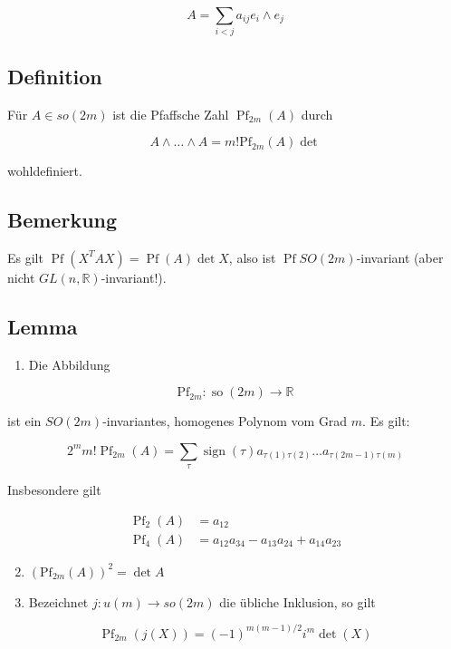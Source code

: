 \documentclass[10pt, letterpaper]{article}
\begin{document}
$$
A=\sum_{i<j} a_{i j} e_{i} \wedge e_{j}
$$

\subsection*{Definition}
Für $A \in s o(2 m)$ ist die Pfaffsche Zahl $\operatorname{Pf}_{2 m}(A)$ durch

$$
A \wedge \ldots \wedge A=m!\mathrm{Pf}_{2 m}(A) \operatorname{det}
$$

wohldefiniert.

\subsection*{Bemerkung}
Es gilt $\operatorname{Pf}\left(X^{T} A X\right)=\operatorname{Pf}(A) \operatorname{det} X$, also ist $\operatorname{Pf} S O(2 m)$-invariant (aber nicht $G L(n, \mathbb{R})$-invariant!).

\subsection*{Lemma}
\begin{enumerate}
  \item Die Abbildung
\end{enumerate}

$$
\mathrm{Pf}_{2 m}: \operatorname{so}(2 m) \rightarrow \mathbb{R}
$$

ist ein $S O(2 m)$-invariantes, homogenes Polynom vom Grad $m$. Es gilt:

$$
2^{m} m!\operatorname{Pf}_{2 m}(A)=\sum_{\tau} \operatorname{sign}(\tau) a_{\tau(1) \tau(2)} \ldots a_{\tau(2 m-1) \tau(m)}
$$

Insbesondere gilt

$$
\begin{aligned}
\operatorname{Pf}_{2}(A) & =a_{12} \\
\operatorname{Pf}_{4}(A) & =a_{12} a_{34}-a_{13} a_{24}+a_{14} a_{23}
\end{aligned}
$$

\begin{enumerate}
  \setcounter{enumi}{1}
  \item $\left(\mathrm{Pf}_{2 m}(A)\right)^{2}=\operatorname{det} A$
  \item Bezeichnet $j: u(m) \rightarrow s o(2 m)$ die übliche Inklusion, so gilt
\end{enumerate}

$$
\operatorname{Pf}_{2 m}(j(X))=(-1)^{m(m-1) / 2} i^{m} \operatorname{det}(X)
$$
\end{document}
